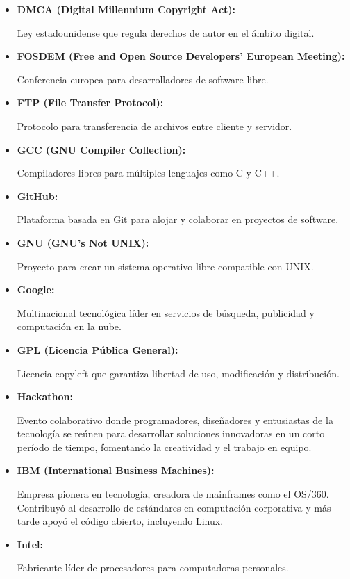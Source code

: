 \documentclass[a4paper,12pt]{article}
\begin{document}
\begin{itemize}
\item \hypertarget{dmca}{\textbf{DMCA (Digital Millennium Copyright Act):}} Ley
estadounidense que regula derechos de autor en el ámbito digital.  \label{dmca}

\item \hypertarget{fosdem}{\textbf{FOSDEM (Free and Open Source Developers'
European Meeting):}} Conferencia europea para desarrolladores de software libre.
\label{fosdem}

\item \hypertarget{ftp}{\textbf{FTP (File Transfer Protocol):}} Protocolo para
transferencia de archivos entre cliente y servidor.  \label{ftp}

\item \hypertarget{gcc}{\textbf{GCC (GNU Compiler Collection):}} Compiladores
libres para múltiples lenguajes como C y C++.  \label{gcc}

\item \hypertarget{github}{\textbf{GitHub:}} Plataforma basada en Git para
alojar y colaborar en proyectos de software.  \label{github}

\item \hypertarget{gnu}{\textbf{GNU (GNU's Not UNIX):}} Proyecto para crear un
sistema operativo libre compatible con UNIX.  \label{gnu}

\item \hypertarget{google}{\textbf{Google:}} Multinacional tecnológica líder en
servicios de búsqueda, publicidad y computación en la nube.

\item \hypertarget{gpl}{\textbf{GPL (Licencia Pública General):}} Licencia
copyleft que garantiza libertad de uso, modificación y distribución.
\label{gpl}

\item \hypertarget{hackathon}{\textbf{Hackathon:}} Evento colaborativo donde
programadores, diseñadores y entusiastas de la tecnología se reúnen para
desarrollar soluciones innovadoras en un corto período de tiempo, fomentando la
creatividad y el trabajo en equipo.

\item \hypertarget{ibm}{\textbf{IBM (International Business Machines):}} Empresa
pionera en tecnología, creadora de mainframes como el OS/360. Contribuyó al
desarrollo de estándares en computación corporativa y más tarde apoyó el código
abierto, incluyendo Linux.

\item \hypertarget{intel}{\textbf{Intel:}} Fabricante líder de procesadores para
computadoras personales.  \label{intel}


\end{itemize}
\end{document}

